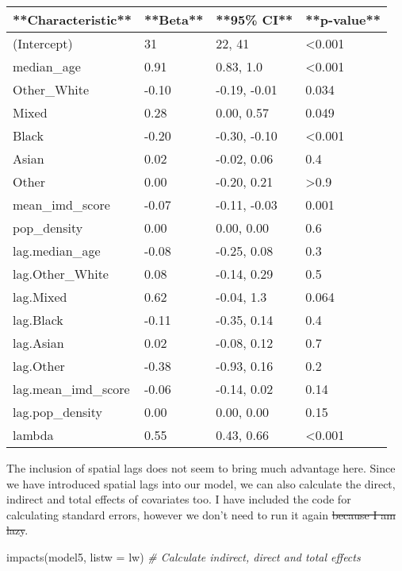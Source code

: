 \documentclass[
]{book}
\newenvironment{Shaded}{\begin{snugshade}}{\end{snugshade}}
\newcommand{\AttributeTok}[1]{\textcolor[rgb]{0.77,0.63,0.00}{#1}}
\newcommand{\CommentTok}[1]{\textcolor[rgb]{0.56,0.35,0.01}{\textit{#1}}}
\newcommand{\FunctionTok}[1]{\textcolor[rgb]{0.00,0.00,0.00}{#1}}
\newcommand{\NormalTok}[1]{#1}
\begin{document}
\begin{tabular}{l|l|l|l}
\hline
**Characteristic** & **Beta** & **95\% CI** & **p-value**\\
\hline
(Intercept) & 31 & 22, 41 & <0.001\\
\hline
median\_age & 0.91 & 0.83, 1.0 & <0.001\\
\hline
Other\_White & -0.10 & -0.19, -0.01 & 0.034\\
\hline
Mixed & 0.28 & 0.00, 0.57 & 0.049\\
\hline
Black & -0.20 & -0.30, -0.10 & <0.001\\
\hline
Asian & 0.02 & -0.02, 0.06 & 0.4\\
\hline
Other & 0.00 & -0.20, 0.21 & >0.9\\
\hline
mean\_imd\_score & -0.07 & -0.11, -0.03 & 0.001\\
\hline
pop\_density & 0.00 & 0.00, 0.00 & 0.6\\
\hline
lag.median\_age & -0.08 & -0.25, 0.08 & 0.3\\
\hline
lag.Other\_White & 0.08 & -0.14, 0.29 & 0.5\\
\hline
lag.Mixed & 0.62 & -0.04, 1.3 & 0.064\\
\hline
lag.Black & -0.11 & -0.35, 0.14 & 0.4\\
\hline
lag.Asian & 0.02 & -0.08, 0.12 & 0.7\\
\hline
lag.Other & -0.38 & -0.93, 0.16 & 0.2\\
\hline
lag.mean\_imd\_score & -0.06 & -0.14, 0.02 & 0.14\\
\hline
lag.pop\_density & 0.00 & 0.00, 0.00 & 0.15\\
\hline
lambda & 0.55 & 0.43, 0.66 & <0.001\\
\hline
\end{tabular}

The inclusion of spatial lags does not seem to bring much advantage here. Since we have introduced spatial lags into our model, we can also calculate the direct, indirect and total effects of covariates too. I have included the code for calculating standard errors, however we don't need to run it again \sout{because I am lazy}.

\begin{Shaded}
\begin{Highlighting}[]
\FunctionTok{impacts}\NormalTok{(model5, }\AttributeTok{listw =}\NormalTok{ lw) }\CommentTok{\# Calculate indirect, direct and total effects}
\end{Highlighting}
\end{Shaded}
\end{document}
